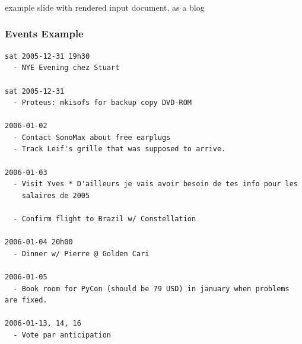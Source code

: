 \documentclass[compress,trans]{beamer}
\begin{document}








\begin{frame}[fragile]
  \frametitle{}

example slide with rendered input document, as a blog

\end{frame}








\begin{frame}[fragile]
  \frametitle{Events Example}

\begin{verbatim}
sat 2005-12-31 19h30
  - NYE Evening chez Stuart

sat 2005-12-31 
  - Proteus: mkisofs for backup copy DVD-ROM

2006-01-02
  - Contact SonoMax about free earplugs
  - Track Leif's grille that was supposed to arrive.

2006-01-03
  - Visit Yves * D'ailleurs je vais avoir besoin de tes info pour les
    salaires de 2005

  - Confirm flight to Brazil w/ Constellation

2006-01-04 20h00 
  - Dinner w/ Pierre @ Golden Cari

2006-01-05
  - Book room for PyCon (should be 79 USD) in january when problems are fixed.

2006-01-13, 14, 16
  - Vote par anticipation

\end{verbatim}

\end{frame}
\end{document}
